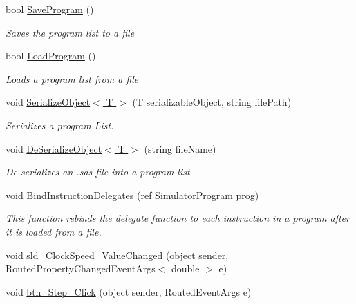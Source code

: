 \begin{DoxyCompactItemize}
bool \hyperlink{class_c_p_u___o_s___simulator_1_1_main_window_a843bbe93c5c2225820d216cc1cb7d4e9}{Save\+Program} ()
\begin{DoxyCompactList}\small\item\em Saves the program list to a file \end{DoxyCompactList}\item 
bool \hyperlink{class_c_p_u___o_s___simulator_1_1_main_window_ad788d74c9d6582f3302912cbbba410b0}{Load\+Program} ()
\begin{DoxyCompactList}\small\item\em Loads a program list from a file \end{DoxyCompactList}\item 
void \hyperlink{class_c_p_u___o_s___simulator_1_1_main_window_a80985670e45349866a463b766f92e27b}{Serialize\+Object$<$ T $>$} (T serializable\+Object, string file\+Path)
\begin{DoxyCompactList}\small\item\em Serializes a program List. \end{DoxyCompactList}\item 
void \hyperlink{class_c_p_u___o_s___simulator_1_1_main_window_a44e09f35524cd53ddab77488989c5833}{De\+Serialize\+Object$<$ T $>$} (string file\+Name)
\begin{DoxyCompactList}\small\item\em De-\/serializes an .sas file into a program list \end{DoxyCompactList}\item 
void \hyperlink{class_c_p_u___o_s___simulator_1_1_main_window_afe4c815db0eb51ebc480374f5af09d0c}{Bind\+Instruction\+Delegates} (ref \hyperlink{class_c_p_u___o_s___simulator_1_1_c_p_u_1_1_simulator_program}{Simulator\+Program} prog)
\begin{DoxyCompactList}\small\item\em This function rebinds the delegate function to each instruction in a program after it is loaded from a file. \end{DoxyCompactList}\item 
void \hyperlink{class_c_p_u___o_s___simulator_1_1_main_window_ace253c0b4beef8898af97df25666df2f}{sld\+\_\+\+Clock\+Speed\+\_\+\+Value\+Changed} (object sender, Routed\+Property\+Changed\+Event\+Args$<$ double $>$ e)
\item 
void \hyperlink{class_c_p_u___o_s___simulator_1_1_main_window_a897049d123dd2ecf2820b02205ce1969}{btn\+\_\+\+Step\+\_\+\+Click} (object sender, Routed\+Event\+Args e)
\item 

\end{DoxyCompactItemize}
